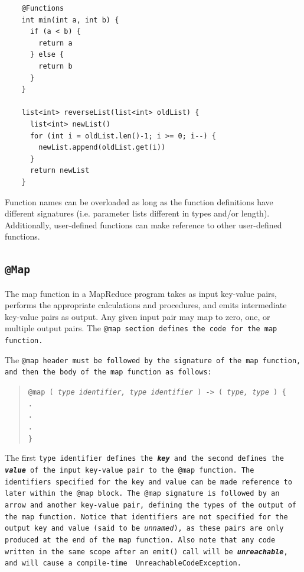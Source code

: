 \documentclass{article}
\begin{document}
\begin{verbatim}
    @Functions
    int min(int a, int b) {
      if (a < b) {
        return a
      } else {
        return b
      }
    }

    list<int> reverseList(list<int> oldList) {
      list<int> newList()
      for (int i = oldList.len()-1; i >= 0; i--) {
        newList.append(oldList.get(i))
      }
      return newList
    }
\end{verbatim}

Function names can be overloaded as long as the function definitions have different
signatures (i.e. parameter lists different in types and/or length). Additionally,
user-defined functions can make reference to other user-defined functions.


\subsection{\tt @Map \rm} %
\label{sub:tt_map_rm}

The map function in a MapReduce program takes as input key-value pairs, performs
the appropriate calculations and procedures, and emits intermediate key-value pairs
as output. Any given input pair may map to zero, one, or multiple output pairs. The
\tt @map \rm section defines the code for the map function.

The \tt @map \rm header must be followed by the signature of the map function, and
then the body of the map function as follows:

\begin{quotation}
  \tt @map ( \rm \emph{type identifier, type identifier} \tt ) -> ( \rm \emph{type, type} \tt ) \{ \\
  \indent \indent . \\
  \indent \indent . \\
  \indent \indent . \\
  \indent \tt \} \rm
\end{quotation}

The first \tt type identifier \rm defines the \emph{\textbf{key}} and the second defines the \emph{\textbf{value}} of the input
key-value pair to the \tt @map \rm function. The identifiers specified for the key and value can be made reference to later
within the \tt @map \rm block. The \tt @map \rm signature is followed by an arrow and another key-value pair, defining the
types of the output of the map function. Notice that identifiers are not specified for the output key and value (said to be
\emph{unnamed}), as these pairs are only produced at the end of the map function. Also note that any code written in the same
scope after an \tt emit() \rm call will be \textbf{\emph{unreachable}}, and will cause a compile-time \tt
UnreachableCodeException\rm.
\end{document}
